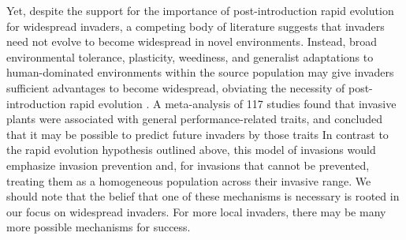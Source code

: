 \documentclass[12pt]{article}\usepackage[]{graphicx}\usepackage[]{color}
\begin{document}
	Yet, despite the support for the importance of post-introduction rapid evolution for widespread invaders, a competing body of literature suggests that invaders need not evolve to become widespread in novel environments. Instead, broad environmental tolerance, plasticity, weediness, and generalist adaptations to human-dominated environments within the source population may give invaders sufficient advantages to become widespread, obviating the necessity of post-introduction rapid evolution \parencite{Richards2006,Schwartz1994,Bock2015,Rejmanek1996,Baker1965}. A meta-analysis of 117 studies found that invasive plants were associated with general performance-related traits, and concluded that it may be possible to predict future invaders by those traits \parencite{VanKleunen2010} %
	In contrast to the rapid evolution hypothesis outlined above, this model of invasions would emphasize invasion prevention and, for invasions that cannot be prevented, treating them as a homogeneous population across their invasive range. We should note that the belief that one of these mechanisms is necessary is rooted in our focus on widespread invaders. For more local invaders, there may be many more possible mechanisms for success. 
\end{document}
